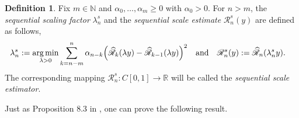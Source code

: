 \documentclass[12pt,reqno]{article}
\def\wh{\widehat}
\numberwithin{equation}{section}
\def\cR{{\mathscr R}}
\theoremstyle{definition}
\newtheorem{definition}[theorem]{Definition}
\def\wh{\widehat}
\def\argmin{\mathop{\hbox{\rm arg\,min}}}
\newcommand{\bR}{\mathbb{R}}
\newcommand{\bN}{\mathbb{N}}
\begin{document}
 \begin{definition}\label{sls and tls def}Fix $m\in\bN$ and $\alpha_0,\dots,\alpha_{m}\ge0$ with $\alpha_0>0$.
For $n>m$, the \textit{sequential scaling factor} $\lambda_{n}^{s}$ and the \textit{sequential scale estimate} $\cR^s_{n}(y)$ are defined as follows,
	\begin{equation}\label{eq_def_seqloc}
		\begin{split}
			\lambda^{s}_{n}&:= \argmin_{\lambda > 0} \sum_{k = n-m}^{n}\alpha_{n-k}\Big(\wh\cR_k(\lambda y) - \wh\cR_{k-1}(\lambda y)\Big)^2 \quad \text{and} \quad
			\cR^s_{n}(y):= \wh\cR_{n}(\lambda^{s}_{n} y).
		\end{split}
	\end{equation}
	The corresponding mapping $\cR^s_{n}:C[0,1]\rightarrow \bR$ will be called the \textit{sequential scale estimator}.
	 \end{definition}

Just as Proposition 8.3 in \cite{HanSchiedHurst}, one can prove the following result.
\end{document}
